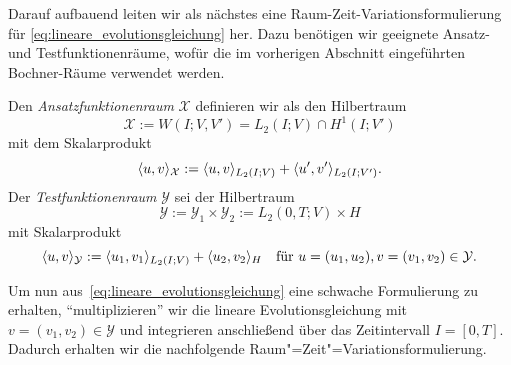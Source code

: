 \documentclass[../main.tex]{subfiles}
\begin{document}
Darauf aufbauend leiten wir als nächstes eine Raum-Zeit-Variationsformulierung für \cref{eq:lineare_evolutionsgleichung} her.
Dazu benötigen wir geeignete Ansatz- und Testfunktionenräume, wofür die im vorherigen Abschnitt eingeführten Bochner-Räume verwendet werden.

\begin{Definition}
\label{definition:ansatz_und_testraum}
    Den \emph{Ansatzfunktionenraum} $\mathcal X$ definieren wir als den Hilbertraum
    \begin{equation}
    \label{eq:ansatzraum_X}
        \mathcal X := W(I; V, V') = L_{2}(I; V) \cap H^{1}(I; V')
    \end{equation}
    mit dem Skalarprodukt
    \begin{equation}
    \label{eq:ansatzraum_skalarprodukt}
        \langle u,v\rangle_{\mathcal X} := \langle u,v\rangle_{L_{2}(I; V)} + \langle u',v'\rangle_{L_{2}(I; V')}.
    \end{equation}
    Der \emph{Testfunktionenraum} $\mathcal Y$ sei der Hilbertraum
    \begin{equation}
    \label{eq:testraum_Y}
        \mathcal Y := \mathcal Y_{1} \times \mathcal Y_{2} := L_{2}(0, T; V) \times H
    \end{equation}
    mit Skalarprodukt
    \begin{equation}
        \label{eq:testraum_skalarprodukt}
        \langle u,v\rangle_{\mathcal Y} := \langle u_{1},v_{1}\rangle_{L_{2}(I; V)} + \langle u_{2},v_{2}\rangle_{H} \quad \text{für } u = (u_{1}, u_{2}), v = (v_{1}, v_{2}) \in \mathcal Y.
    \end{equation}
\end{Definition}

Um nun aus~\cref{eq:lineare_evolutionsgleichung} eine schwache Formulierung zu erhalten, \enquote{multiplizieren} wir die lineare Evolutionsgleichung mit $v = (v_{1}, v_{2}) \in \mathcal Y$ und integrieren anschließend über das Zeitintervall $I = [0, T]$.
Dadurch erhalten wir die nachfolgende Raum"=Zeit"=Variationsformulierung.
\end{document}
